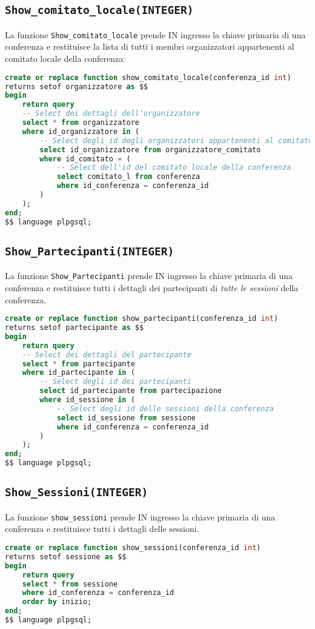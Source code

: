 \subsection{\texttt{Show\_comitato\_locale(INTEGER)}}
La funzione \texttt{Show\_comitato\_locale} prende IN ingresso la chiave primaria di una conferenza e restituisce la lista di tutti i membri organizzatori appartenenti al comitato locale della conferenza:
\begin{lstlisting}[language=SQL, style=mystyle]
create or replace function show_comitato_locale(conferenza_id int)
returns setof organizzatore as $$
begin
    return query
    -- Select dei dettagli dell'organizzatore
    select * from organizzatore
    where id_organizzatore in (
        -- Select degli id degli organizzatori appartenenti al comitato locale
        select id_organizzatore from organizzatore_comitato
        where id_comitato = (
            -- Select dell'id del comitato locale della conferenza
            select comitato_l from conferenza
            where id_conferenza = conferenza_id
        )
    );
end;
$$ language plpgsql;
\end{lstlisting}
\subsection{\texttt{Show\_Partecipanti(INTEGER)}}
La funzione \texttt{Show\_Partecipanti} prende IN ingresso la chiave primaria di una conferenza e restituisce tutti i dettagli dei partecipanti di \textit{tutte le sessioni} della conferenza.
\begin{lstlisting}[language=SQL,style=mystyle]
create or replace function show_partecipanti(conferenza_id int)
returns setof partecipante as $$
begin
    return query
    -- Select dei dettagli del partecipante
    select * from partecipante
    where id_partecipante in (
        -- Select degli id dei partecipanti
        select id_partecipante from partecipazione
        where id_sessione in (
            -- Select degli id delle sessioni della conferenza
            select id_sessione from sessione
            where id_conferenza = conferenza_id
        )
    );
end;
$$ language plpgsql;
\end{lstlisting}
\subsection{\texttt{Show\_Sessioni(INTEGER)}}
La funzione \texttt{show\_sessioni} prende IN ingresso la chiave primaria di una conferenza e restituisce tutti i dettagli delle sessioni.
\begin{lstlisting}[language=SQL, style=mystyle]
create or replace function show_sessioni(conferenza_id int)
returns setof sessione as $$
begin
    return query
    select * from sessione
    where id_conferenza = conferenza_id
    order by inizio;
end;
$$ language plpgsql;
\end{lstlisting}
